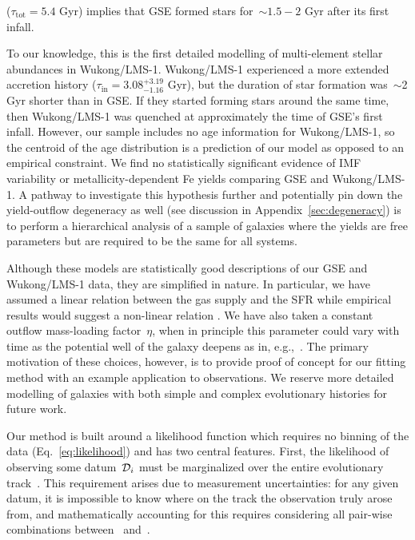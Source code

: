\documentclass[foo.tex]{subfiles}
\begin{document}
($\tau_\text{tot} = 5.4$ Gyr) implies that GSE formed stars for~$\sim$$1.5 - 2$
Gyr after its first infall.
\par
To our knowledge, this is the first detailed modelling of multi-element stellar
abundances in Wukong/LMS-1.
Wukong/LMS-1 experienced a more extended accretion history
($\tau_\text{in} = 3.08^{+3.19}_{-1.16}$ Gyr), but the duration of star
formation was~$\sim$2 Gyr shorter than in GSE.
If they started forming stars around the same time, then Wukong/LMS-1 was
quenched at approximately the time of GSE's first infall.
However, our sample includes no age information for Wukong/LMS-1, so the
centroid of the age distribution is a prediction of our model as opposed to an
empirical constraint.
We find no statistically significant evidence of IMF variability or
metallicity-dependent Fe yields comparing GSE and Wukong/LMS-1.
A pathway to investigate this hypothesis further and potentially pin down the
yield-outflow degeneracy as well (see discussion in
Appendix~\ref{sec:degeneracy}) is to perform a hierarchical analysis of a
sample of galaxies where the yields are free parameters but are required to be
the same for all systems.
\par
Although these models are statistically good descriptions of our GSE and
Wukong/LMS-1 data, they are simplified in nature.
In particular, we have assumed a linear relation between the gas supply and the
SFR while empirical results would suggest a non-linear relation
\citep[e.g.,][]{Kennicutt1998, Kennicutt2012, delosReyes2019, Kennicutt2021}.
We have also taken a constant outflow mass-loading factor~$\eta$, when in
principle this parameter could vary with time as the potential well of the
galaxy deepens as in, e.g.,~\citet{Conroy2022}.
The primary motivation of these choices, however, is to provide proof of
concept for our fitting method with an example application to observations.
We reserve more detailed modelling of galaxies with both simple and complex
evolutionary histories for future work.
\par
Our method is built around a likelihood function which requires no binning of
the data (Eq.~\ref{eq:likelihood}) and has two central features.
First, the likelihood of observing some datum~$\script{D}_i$ must be
marginalized over the entire evolutionary track~.
This requirement arises due to measurement uncertainties: for any given datum,
it is impossible to know where on the track the observation truly arose from,
and mathematically accounting for this requires considering all pair-wise
combinations between~ and~.
$$
\end{document}
